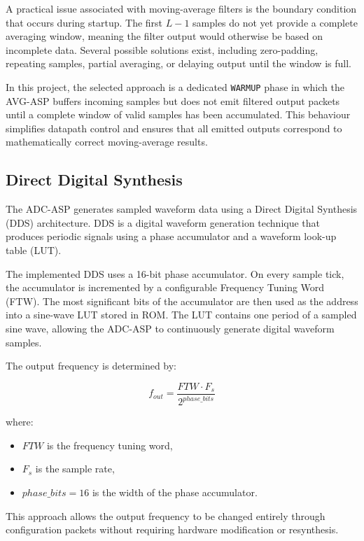 \documentclass[10pt, a4paper]{article}
\begin{document}
A practical issue associated with moving-average filters is the boundary condition that occurs during startup. The first $L-1$ samples do not yet provide a complete averaging window, meaning the filter output would otherwise be based on incomplete data. Several possible solutions exist, including zero-padding, repeating samples, partial averaging, or delaying output until the window is full.

In this project, the selected approach is a dedicated \texttt{WARMUP} phase in which the AVG-ASP buffers incoming samples but does not emit filtered output packets until a complete window of valid samples has been accumulated. This behaviour simplifies datapath control and ensures that all emitted outputs correspond to mathematically correct moving-average results.

\subsection{Direct Digital Synthesis}

The ADC-ASP generates sampled waveform data using a Direct Digital Synthesis (DDS) architecture. DDS is a digital waveform generation technique that produces periodic signals using a phase accumulator and a waveform look-up table (LUT).

The implemented DDS uses a 16-bit phase accumulator. On every sample tick, the accumulator is incremented by a configurable Frequency Tuning Word (FTW). The most significant bits of the accumulator are then used as the address into a sine-wave LUT stored in ROM. The LUT contains one period of a sampled sine wave, allowing the ADC-ASP to continuously generate digital waveform samples.

The output frequency is determined by:

\begin{equation}
f_{out} = \frac{FTW \cdot F_s}{2^{phase\_bits}}
\label{eq:dds_frequency}
\end{equation}

where:
\begin{itemize}
    \item $FTW$ is the frequency tuning word,
    \item $F_s$ is the sample rate,
    \item $phase\_bits = 16$ is the width of the phase accumulator.
\end{itemize}

This approach allows the output frequency to be changed entirely through configuration packets without requiring hardware modification or resynthesis.
\end{document}
